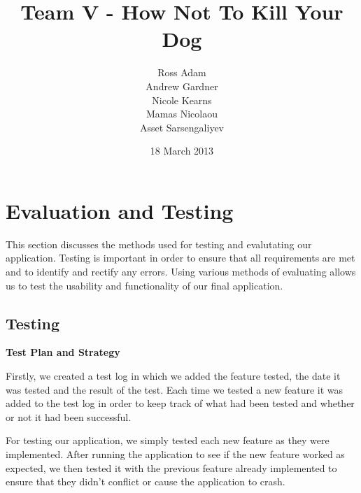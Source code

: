 \documentclass{l3proj}
\begin{document}
\title{Team V - How Not To Kill Your Dog}
\author{Ross Adam \\
        Andrew Gardner \\
        Nicole Kearns \\
        Mamas Nicolaou \\
        Asset Sarsengaliyev}
\date{18 March 2013}
\maketitle
\tableofcontents

\chapter{Evaluation and Testing}
\label{evaluation}

This section discusses the methods used for testing and evalutating our application. Testing is important in order to ensure that all requirements are met and to identify and rectify any errors. Using various methods of evaluating allows us to test the usability and functionality of our final application.

\section{Testing}

\textbf{Test Plan and Strategy}



Firstly, we created a test log in which we added the feature tested, the date it was tested and the result of the test. Each time we tested a new feature it was added to the test log in order to keep track of what had been tested and whether or not it had been successful.

For testing our application, we simply tested each new feature as they were implemented. After running the application to see if the new feature worked as expected, we then tested it with the previous feature already implemented to ensure that they didn't conflict or cause the application to crash.
\end{document}
